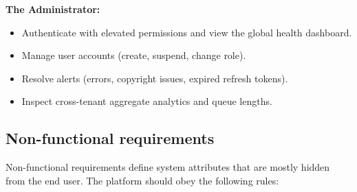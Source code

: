 \noindent\textbf{The Administrator:}
\begin{itemize}
  \item Authenticate with elevated permissions and view the global health dashboard.
  \item Manage user accounts (create, suspend, change role).
  \item Resolve alerts (errors, copyright issues, expired refresh tokens).
  \item Inspect cross-tenant aggregate analytics and queue lengths.
\end{itemize}

\subsection{Non-functional requirements}
\label{sec:nonfunc_req}

Non-functional requirements define system attributes that are mostly hidden from the end
user. The platform should obey the following rules:

